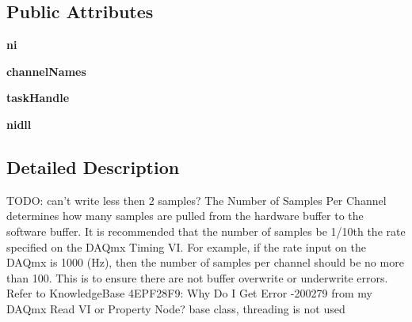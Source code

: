 \subsection*{Public Attributes}
\begin{DoxyCompactItemize}
\item 
\hypertarget{classanalog__outputs__to__josh_1_1_ni_channels_proto_acd2c962ee27b320ff58f70be70a86237}{{\bfseries ni}}\label{classanalog__outputs__to__josh_1_1_ni_channels_proto_acd2c962ee27b320ff58f70be70a86237}

\item 
\hypertarget{classanalog__outputs__to__josh_1_1_ni_channels_proto_ae99600042abe3b2d53f3741ca2e9f1c2}{{\bfseries channel\-Names}}\label{classanalog__outputs__to__josh_1_1_ni_channels_proto_ae99600042abe3b2d53f3741ca2e9f1c2}

\item 
\hypertarget{classanalog__outputs__to__josh_1_1_ni_channels_proto_ac3908670d600783f8d885c9514e33829}{{\bfseries task\-Handle}}\label{classanalog__outputs__to__josh_1_1_ni_channels_proto_ac3908670d600783f8d885c9514e33829}

\item 
\hypertarget{classanalog__outputs__to__josh_1_1_ni_channels_proto_a5bd4f82a0bef11101dd51874a0e787a9}{{\bfseries nidll}}\label{classanalog__outputs__to__josh_1_1_ni_channels_proto_a5bd4f82a0bef11101dd51874a0e787a9}

\end{DoxyCompactItemize}


\subsection{Detailed Description}
\begin{DoxyVerb}TODO: can't write less then 2 samples?
The Number of Samples Per Channel determines how many samples are pulled from the hardware buffer to the software buffer.
It is recommended that the number of samples be 1/10th the rate specified on the DAQmx Timing VI.
For example, if the rate input on the DAQmx is 1000 (Hz), then the number of samples per channel should be no more than 100.
This is to ensure there are not buffer overwrite or underwrite errors.  Refer to KnowledgeBase 4EPF28F9: Why Do I Get Error
-200279 from my DAQmx Read VI or Property Node?
base class, threading is not used 
\end{DoxyVerb}
 

